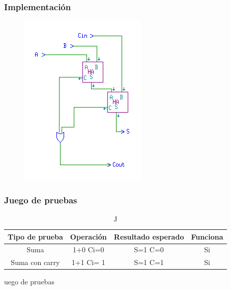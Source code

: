 \documentclass{article}
\begin{document}
		\subsubsection*{Implementación}
		 \begin{figure}[ht]
		 	\includegraphics[width=0.8\linewidth]{FA}
		 	\centering
		 \end{figure}


		\subsubsection*{Juego de pruebas}
			\begin{table}[ht]
			\begin{center}
				\begin{tabular}{| c | c | c | c |}
					\hline
					Tipo de prueba & Operación & Resultado esperado & Funciona \\ \hline
					
					Suma & 1+0 Ci=0 & S=1 C=0 & Si \\ \hline
					Suma con carry & 1+1 Ci= 1 & S=1 C=1 & Si \\ \hline
				\end{tabular}
				\caption Juego de pruebas
			\end{center}
		\end{table}
\end{document}
